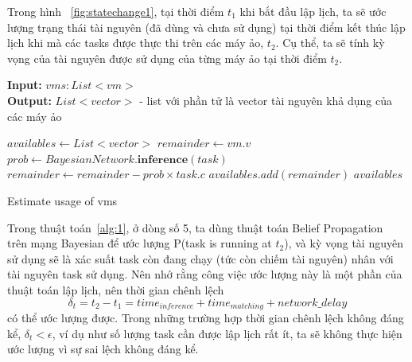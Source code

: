 \documentclass{my_style}
\begin{document}
\noindent
Trong hình ~\ref{fig:statechange1}, tại thời điểm $t_{1}$ khi bắt đầu lập lịch, ta sẽ ước lượng trạng thái tài nguyên (đã dùng và chưa sử dụng) tại thời điểm kết thúc lập lịch khi mà các tasks được thực thi trên các máy ảo, $t_{2}$. Cụ thể, ta sẽ tính kỳ vọng của tài nguyên được sử dụng của từng máy ảo tại thời điểm $t_{2}$. 
\begin{algorithm}[H]
\textbf{Input:} $vms: List<vm>$ \\ 
\textbf{Output:} $List<vector>$ - list với phần tử là vector tài nguyên khả dụng của các máy ảo
\begin{algorithmic}[1]
	\STATE$ availables \leftarrow  List<vector>$
		\STATE $remainder \leftarrow vm.v$
			\STATE $prob \leftarrow BayesianNetwork.\textbf{inference}(task)$
			\STATE $remainder \leftarrow remainder - prob \times task.c$
		\ENDFOR
		\STATE $availables.add(remainder)$
	\ENDFOR
	\RETURN $availables$
\end{algorithmic}
\caption{Estimate usage of vms }
\label{alg:1}
\end{algorithm}

\noindent
Trong thuật toán~\ref{alg:1}, ở dòng số 5, ta dùng thuật toán Belief Propagation~\cite{29} trên mạng Bayesian để ước lượng P(task is running at $t_{2}$), và kỳ vọng tài nguyên sử dụng sẽ là xác suất task còn đang chạy (tức còn chiếm tài nguyên) nhân với tài nguyên task sử dụng. Nên nhớ rằng công việc ước lượng này là một phần của thuật toán lập lịch, nên thời gian chênh lệch 
\begin{equation}
	\delta_{t} = t_{2} - t_{1} = time_{inference} + time_{matching} + network\_delay
\end{equation}
có thể ước lượng được. 
Trong những trường hợp thời gian chênh lệch không đáng kể, $\delta_{t} < \epsilon$, ví dụ như số lượng task cần được lập lịch rất ít, ta sẽ không thực hiện ước lượng vì sự sai lệch không đáng kể.
\end{document}
